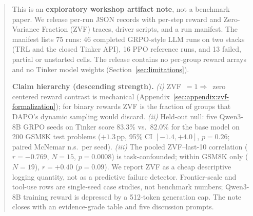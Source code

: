 \begin{abstract}
This is an \textbf{exploratory workshop artifact note}, not a benchmark paper.
We release per-run JSON records with per-step reward and Zero-Variance
Fraction (ZVF) traces, driver scripts, and a run manifest. The manifest lists
75 runs: 46 completed GRPO-style LLM runs on two stacks (TRL and the closed
Tinker API), 16 PPO reference runs, and 13 failed, partial or unstarted
cells. The release contains no per-group reward arrays and no Tinker model weights
(Section~\ref{sec:limitations}).

\textbf{Claim hierarchy (descending strength).}
\textit{(i)} ZVF~$=1\Rightarrow$~zero centered reward contrast is mechanical
(Appendix~\ref{sec:appendix:zvf-formalization}); for binary rewards ZVF is the
fraction of groups that DAPO's dynamic sampling would discard.
\textit{(ii)} Held-out null: five Qwen3-8B GRPO seeds on Tinker score
$83.3\%$ vs.\ $82.0\%$ for the base model on 200 GSM8K test problems
($+1.3$\,pp, 95\% CI $[-1.4,+4.0]$, $p{=}0.26$; paired McNemar n.s.\ per seed).
\textit{(iii)} The pooled ZVF--last-10 correlation
($r{=}{-}0.769$, $N{=}15$, $p{=}0.0008$) is task-confounded; within
GSM8K only ($N{=}19$), $r{=}{+}0.40$ ($p{=}0.09$).
We report ZVF as a cheap descriptive logging quantity, not as a
predictive failure detector. Frontier-scale and tool-use rows are
single-seed case studies, not benchmark numbers; Qwen3-8B training reward
is depressed by a 512-token generation cap.
The note closes with an evidence-grade table and five discussion prompts.
\end{abstract}
